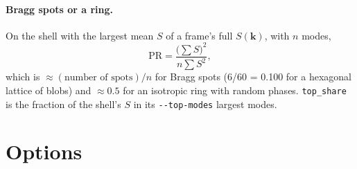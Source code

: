 \documentclass[11pt]{article}
\newcommand{\code}[1]{\texttt{#1}}
\begin{document}
\paragraph{Bragg spots or a ring.} On the shell with the largest mean $S$ of a
frame's full $S(\mathbf k)$, with $n$ modes,
\begin{equation}
  \mathrm{PR} = \frac{\bigl(\sum S\bigr)^2}{n\sum S^2} ,
\end{equation}
which is $\approx(\text{number of spots})/n$ for Bragg spots (6/60 = 0.100 for a
hexagonal lattice of blobs) and $\approx0.5$ for an isotropic ring with random
phases. \code{top\_share} is the fraction of the shell's $S$ in its
\code{-{}-top-modes} largest modes.

\section{Options}
\end{document}
